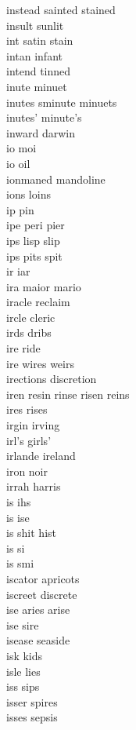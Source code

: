 instead sainted stained\\
insult sunlit\\
int satin stain  \\
intan infant \\
intend tinned\\
inute minuet \\
inutes sminute minuets \\
inutes' minute's \\
inward darwin\\
io moi \\
io oil \\
ionmaned mandoline \\
ions loins \\
ip pin \\
ipe peri pier \\
ips lisp slip \\
ips pits spit \\
ir iar \\
ira maior mario  \\
iracle reclaim \\
ircle cleric \\
irds dribs \\
ire ride \\
ire wires weirs  \\
irections discretion \\
iren resin rinse risen reins \\
ires rises \\
irgin irving \\
irl's girls' \\
irlande ireland\\
iron noir\\
irrah harris \\
is ihs \\
is ise \\
is shit hist  \\
is si\\
is smi \\
iscator apricots \\
iscreet discrete \\
ise aries arise  \\
ise sire \\
isease seaside \\
isk kids \\
isle lies\\
iss sips \\
isser spires \\
isses sepsis \\
